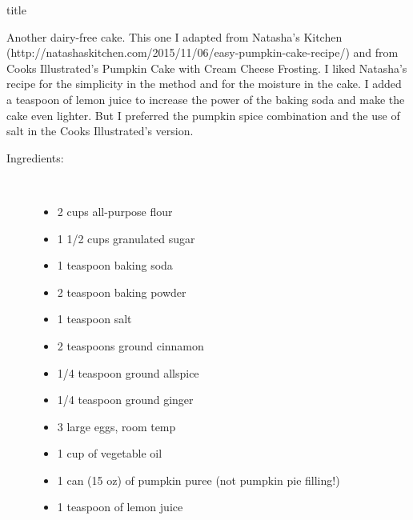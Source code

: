 \documentclass [11pt, letterpaper] {article}
\begin{document}
 {title}

Another dairy-free cake. This one I adapted from Natasha's Kitchen (http://natashaskitchen.com/2015/11/06/easy-pumpkin-cake-recipe/) and from Cooks Illustrated's Pumpkin Cake with Cream Cheese Frosting. I liked Natasha's recipe for the simplicity in the method and for the moisture in the cake. I added a teaspoon of lemon juice to increase the power of the baking soda and make the cake even lighter. But I preferred the pumpkin spice combination and the use of salt in the Cooks Illustrated's version.

 
\begin{description}

\item[Ingredients:]\ \\
	\begin{itemize}
	\item 2 cups all-purpose flour 
	\item 1 1/2 cups granulated sugar
	\item 1 teaspoon baking soda 
	\item 2 teaspoon baking powder
	\item 1 teaspoon salt
	\item 2 teaspoons ground cinnamon
	\item 1/4 teaspoon ground allspice
	\item 1/4 teaspoon ground ginger
	\item 3 large eggs, room temp
	\item 1 cup of vegetable oil
	\item 1 can (15 oz) of pumpkin puree (not pumpkin pie filling!)
	\item 1 teaspoon of lemon juice
	\end{itemize}


\end{description}
\end{document}
